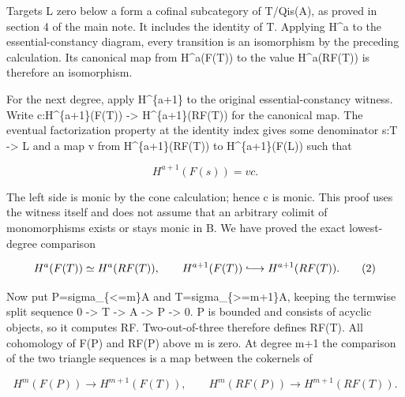 Targets L zero below a form a cofinal subcategory of T/\allowbreak{}Qis(A)\allowbreak{},\allowbreak{} as proved in section 4 of the main note. It includes the identity of T. Applying H\^{}a to the essential-constancy diagram,\allowbreak{} every transition is an isomorphism by the preceding calculation. Its canonical map from H\textasciicircum{}a(F(T)\allowbreak{})\allowbreak{} to the value H\textasciicircum{}a(RF(T)\allowbreak{})\allowbreak{} is therefore an isomorphism.

For the next degree,\allowbreak{} apply H\textasciicircum{}\{a\allowbreak{}+1\} to the original essential-constancy witness. Write c:\allowbreak{}H\textasciicircum{}\{a\allowbreak{}+1\}(F(T)\allowbreak{})\allowbreak{} \allowbreak{}-> H\textasciicircum{}\{a\allowbreak{}+1\}(RF(T)\allowbreak{})\allowbreak{} for the canonical map. The eventual factorization property at the identity index gives some denominator s:\allowbreak{}T \allowbreak{}-> L and a map v from H\textasciicircum{}\{a\allowbreak{}+1\}(RF(T)\allowbreak{})\allowbreak{} to H\textasciicircum{}\{a\allowbreak{}+1\}(F(L)\allowbreak{})\allowbreak{} such that

\[
 H^{a+1}(F(s))=v c.
\]

The left side is monic by the cone calculation; hence c is monic. This proof uses the witness itself and does not assume that an arbitrary colimit of monomorphisms exists or stays monic in B. We have proved the exact lowest-degree comparison

\[
 H^a(F(T))\simeq H^a(RF(T)),\qquad
 H^{a+1}(F(T))\lhook\joinrel\longrightarrow H^{a+1}(RF(T)). \tag{2}
\]

Now put P\allowbreak{}=sigma\_\allowbreak{}\{<\allowbreak{}=m\}A and T\allowbreak{}=sigma\_\allowbreak{}\{>\allowbreak{}=m\allowbreak{}+1\}A,\allowbreak{} keeping the termwise split sequence 0 \allowbreak{}-> T \allowbreak{}-> A \allowbreak{}-> P \allowbreak{}-> 0. P is bounded and consists of acyclic objects,\allowbreak{} so it computes RF. Two-out-of-three therefore defines RF(T)\allowbreak{}. All cohomology of F(P)\allowbreak{} and RF(P)\allowbreak{} above m is zero. At degree m\allowbreak{}+1 the comparison of the two triangle sequences is a map between the cokernels of

\[
 H^m(F(P))\longrightarrow H^{m+1}(F(T)),
 \qquad
 H^m(RF(P))\longrightarrow H^{m+1}(RF(T)).
\]

